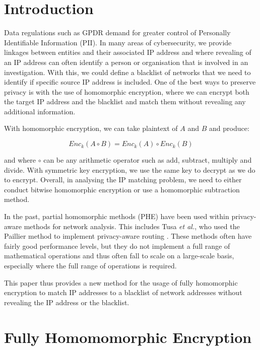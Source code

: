 \documentclass[envcountsame,runningheads,notitlepage]{llncs}
\begin{document}

\section{Introduction}
Data regulations such as GPDR \cite{gdpr2016general} demand for greater control of Personally Identifiable Information (PII). In many areas of cybersecurity, we provide linkages between entities and their associated IP address and where revealing of an IP address can often identify a person or organisation that is involved in an investigation. With this, we could define a blacklist of networks that we need to identify if specific source IP address is included. One of the best ways to preserve privacy is with the use of homomorphic encryption, where we can encrypt both the target IP address and the blacklist and match them without revealing any additional information. 

 With homomorphic encryption, we can take plaintext of $A$ and $B$ and produce:

\begin{equation}
Enc_k(A \circ B) = Enc_k(A) \circ Enc_k(B)  
\end{equation}

and where $\circ$ can be any arithmetic operator such as add, subtract, multiply and divide. With symmetric key encryption, we use the same key to decrypt as we do to encrypt. Overall, in analysing the IP matching problem, we need to either conduct bitwise homomorphic encryption or use a homomorphic subtraction method. 

In the past, partial homomorphic methods (PHE) have been used within privacy-aware methods for network analysis. This includes Tusa \emph{et al.}, who used the Paillier method to implement privacy-aware routing  \cite{tusa2023homomorphic}. These methods often have fairly good performance levels, but they do not implement a full range of mathematical operations and thus often fall to scale on a large-scale basis, especially where the full range of operations is required. 

This paper thus provides a new method for the usage of fully homomorphic encryption to match IP addresses to a blacklist of network addresses without revealing the IP address or the blacklist.  


\section{Fully Homomomorphic Encryption}
\end{document}
